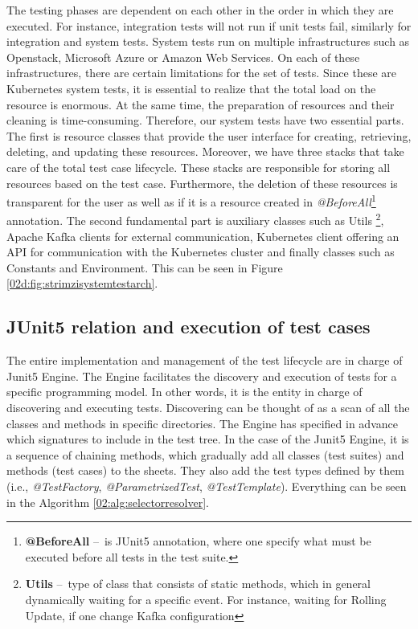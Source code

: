 The testing phases are dependent on each other in the order in which they are executed. For instance, integration tests will not run if unit tests fail, similarly for integration and system tests. System tests run on multiple infrastructures such as Openstack, Microsoft Azure or Amazon Web Services. On each of these infrastructures, there are certain limitations for the set of tests. Since these are Kubernetes system tests, it is essential to realize that the total load on the resource is enormous. At the same time, the preparation of resources and their cleaning is time-consuming. Therefore, our system tests have two essential parts. The first is resource classes that provide the user interface for creating, retrieving, deleting, and updating these resources.
Moreover, we have three stacks that take care of the total test case lifecycle. These stacks are responsible for storing all resources based on the test case. Furthermore, the deletion of these resources is transparent for the user as well as if it is a resource created in \emph{@BeforeAll}\footnote{\textbf{@BeforeAll } \---\ is JUnit5 annotation, where one specify what must be executed before all tests in the test suite.} annotation. The second fundamental part is auxiliary classes such as Utils \footnote {\textbf{Utils} \---\ type of class that consists of static methods, which in general dynamically waiting for a specific event. For instance, waiting for Rolling Update, if one change Kafka configuration}, Apache Kafka clients for external communication, Kubernetes client offering an API for communication with the Kubernetes cluster and finally classes such as Constants and Environment. This can be seen in Figure \ref{02d:fig:strimzisystemtestarch}.

\subsection{JUnit5 relation and execution of test cases}
\label{02:subsec:strimziJunit5relation:execution}

The entire implementation and management of the test lifecycle are in charge of Junit5 Engine. The Engine facilitates the discovery and execution of tests for a specific programming model. In other words, it is the entity in charge of discovering and executing tests. Discovering can be thought of as a scan of all the classes and methods in specific directories. The Engine has specified in advance which signatures to include in the test tree. In the case of the Junit5 Engine, it is a sequence of chaining methods, which gradually add all classes (test suites) and methods (test cases) to the sheets. They also add the test types defined by them (i.e., \emph{@TestFactory}, \emph{@ParametrizedTest}, \emph{@TestTemplate}). Everything can be seen in the  Algorithm \ref{02:alg:selectorresolver}. 

